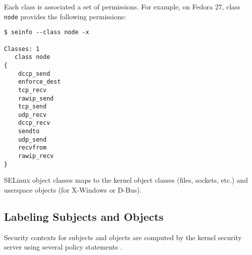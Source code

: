 Each class is associated a set of permissions. For example, on Fedora 27, class
\texttt{node} provides the following permissions:
\begin{lstlisting}
$ seinfo --class node -x

Classes: 1
   class node
{
	dccp_send
	enforce_dest
	tcp_recv
	rawip_send
	tcp_send
	udp_recv
	dccp_recv
	sendto
	udp_send
	recvfrom
	rawip_recv
}
\end{lstlisting}
SELinux object classes maps to the kernel object classes (files, sockets, etc.)
and userspace objects (for X-Windows or D-Bus).

\subsection{Labeling Subjects and Objects}
Security contexts for subjects and objects are computed by the kernel security
server using several policy statements \cite[pp.~31--33]{tsn}.

